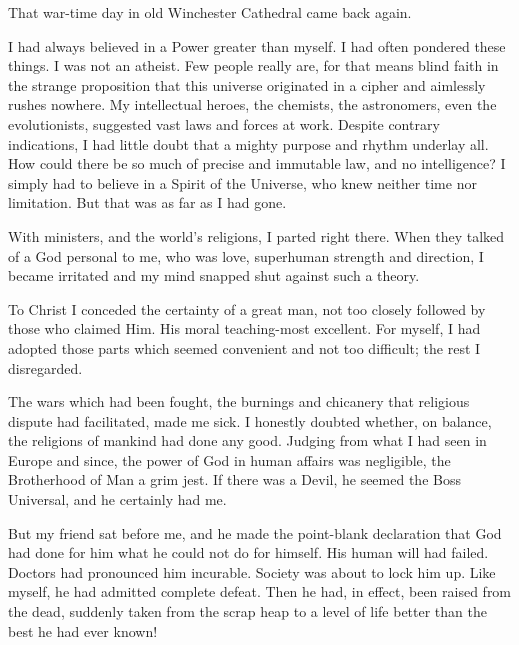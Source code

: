 \begin{biblechapter}
    That war-time day in old Winchester Cathedral came back again.

\verse I had always believed in a Power greater than myself.
\verse I had often pondered these things.
\verse I was not an atheist.
\verse Few people really are, 
    for that means blind faith in the strange proposition 
    that this universe originated in a cipher and aimlessly rushes nowhere.
\verse My intellectual heroes, the chemists, the astronomers, 
    even the evolutionists, 
    suggested vast laws and forces at work.
\verse Despite contrary indications, 
    I had little doubt that a mighty purpose and rhythm underlay all.
\verse How could there be so much of precise and immutable law, and no intelligence?
\verse I simply had to believe in a Spirit of the Universe, 
    who knew neither time nor limitation.
\verse But that was as far as I had gone.

\verse With ministers, and the world's religions, I parted right there.
\verse When they talked of a God personal to me, 
    who was love, superhuman strength and direction, 
    I became irritated and my mind snapped shut against such a theory.

\verse To Christ I conceded the certainty of a great man, 
    not too closely followed by those who claimed Him.
\verse His moral teaching-most excellent.
\verse For myself, 
    I had adopted those parts which seemed convenient and not too difficult;
    the rest I disregarded.

\verse The wars which had been fought, 
    the burnings and chicanery that religious dispute had facilitated, 
    made me sick.
\verse I honestly doubted whether, on balance, 
    the religions of mankind had done any good.
\verse Judging from what I had seen in Europe and since, 
    the power of God in human affairs was negligible, 
    the Brotherhood of Man a grim jest.
\verse If there was a Devil, he seemed the Boss Universal, 
    and he certainly had me.

\verse But my friend sat before me, 
    and he made the point-blank declaration that 
    God had done for him what he could not do for himself.
\verse His human will had failed.
\verse Doctors had pronounced him incurable.
\verse Society was about to lock him up.
\verse Like myself, he had admitted complete defeat.
\verse Then he had, in effect, been raised from the dead, 
    suddenly taken from the scrap heap 
    to a level of life better than the best he had ever known!


\end{biblechapter}
